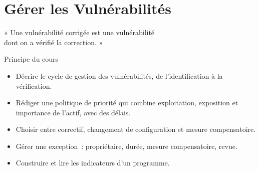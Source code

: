
\chapter{Gérer les Vulnérabilités}
\label{chap:gerer}

\epigraph{%
    « Une vulnérabilité corrigée est une vulnérabilité\\
    dont on a vérifié la correction. »%
}{Principe du cours}


\begin{boxobjectifs}
\begin{itemize}
    \item Décrire le cycle de gestion des vulnérabilités, de
          l'identification à la vérification.
    \item Rédiger une politique de priorité qui combine exploitation,
          exposition et importance de l'actif, avec des délais.
    \item Choisir entre correctif, changement de configuration et mesure
          compensatoire.
    \item Gérer une exception~: propriétaire, durée, mesure compensatoire,
          revue.
    \item Construire et lire les indicateurs d'un programme.
\end{itemize}
\end{boxobjectifs}

\bigskip

